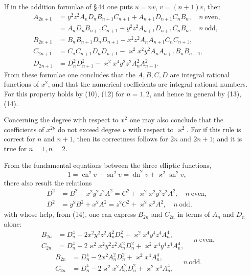 \documentclass[11pt]{article}
\providecommand{\sn}{\operatorname{sn}}
\providecommand{\cn}{\operatorname{cn}}
\providecommand{\dn}{\operatorname{dn}}
\begin{document}
If in the addition formulae of \S\,44 one puts $u=nv$, $v=(n+1)v$, then
\begin{equation}
\begin{aligned}
A_{2n+1}&=y^2z^2A_nD_nB_{n+1}C_{n+1}+A_{n+1}D_{n+1}C_nB_n,\quad n\ \text{even},\\
&=A_nD_nB_{n+1}C_{n+1}+y^2z^2A_{n+1}D_{n+1}C_nB_n,\quad n\ \text{odd},\\
B_{2n+1}&=B_nB_{n+1}D_nD_{n+1}-x^2z^2A_nA_{n+1}C_nC_{n+1},\\
C_{2n+1}&=C_nC_{n+1}D_nD_{n+1}-\varkappa^2x^2y^2A_nA_{n+1}B_nB_{n+1},\\
D_{2n+1}&=D_n^2D_{n+1}^2-\varkappa^2x^4y^2z^2A_n^2A_{n+1}^2.
\end{aligned}
\tag{14}
\end{equation}
From these formulae one concludes that the $A,B,C,D$ are integral rational functions of
$x^2$, and that the numerical coefficients are integral rational numbers. For this property
holds by (10), (12) for $n=1,2$, and hence in general by (13), (14).

Concerning the degree with respect to $x^2$ one may also conclude that the coefficients of
$x^{2\nu}$ do not exceed degree $\nu$ with respect to $\varkappa^2$. For if this rule is correct
for $n$ and $n+1$, then its correctness follows for $2n$ and $2n+1$; and it is true for
$n=1,n=2$.

From the fundamental equations between the three elliptic functions,
\[
1=\cn^2v+\sn^2v=\dn^2v+\varkappa^2\sn^2v,
\]
there also result the relations
\begin{equation}
\begin{aligned}
D^2&=B^2+x^2y^2z^2A^2=C^2+\varkappa^2x^2y^2z^2A^2,\quad n\ \text{even},\\
D^2&=y^2B^2+x^2A^2=z^2C^2+\varkappa^2x^2A^2,\quad n\ \text{odd},
\end{aligned}
\tag{15}
\end{equation}
with whose help, from (14), one can express $B_{2n}$ and $C_{2n}$ in terms of $A_n$ and
$D_n$ alone:
\begin{equation}
\begin{aligned}
B_{2n}&=D_n^4-2x^2y^2z^2A_n^2D_n^2+\varkappa^2x^4y^4z^4A_n^4,\\
C_{2n}&=D_n^4-2\varkappa^2x^2y^2z^2A_n^2D_n^2+\varkappa^2x^4y^4z^4A_n^4,
\end{aligned}\quad n\ \text{even},
\tag{16a}
\end{equation}
\[
\begin{aligned}
B_{2n}&=D_n^4-2x^2A_n^2D_n^2+\varkappa^2x^4A_n^4,\\
C_{2n}&=D_n^4-2\varkappa^2x^2A_n^2D_n^2+\varkappa^2x^4A_n^4,
\end{aligned}\quad n\ \text{odd}.
\tag{16b}
\]
\end{document}
